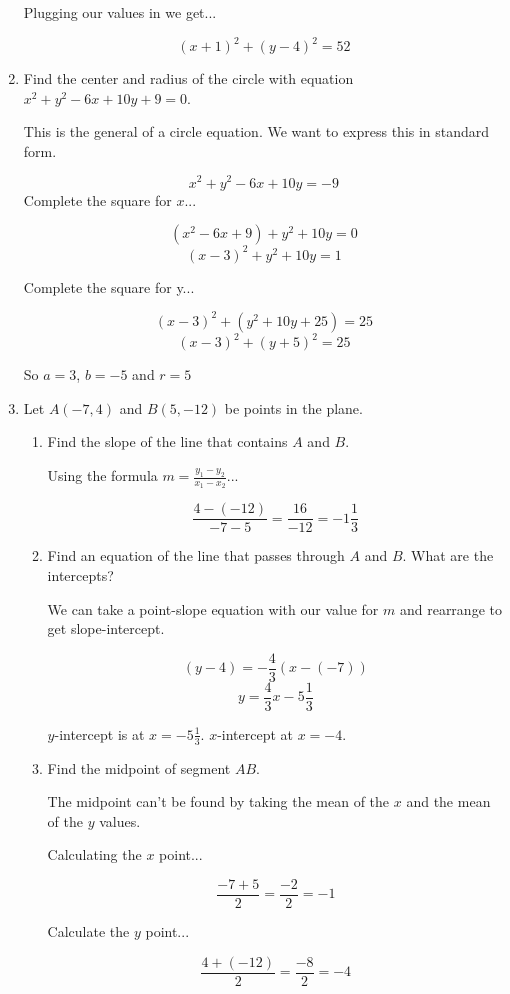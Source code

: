 \documentclass{article}
\begin{document}
\begin{enumerate}
	Plugging our values in we get...

	$$(x + 1)^2 + (y  - 4)^2 = 52$$

	\item Find the center and radius of the circle with equation $x^2 + y^2 - 6x + 10y + 9 = 0$.

		This is the general of a circle equation. We want to express this in standard form.

		$$x^2 + y^2 - 6x + 10y = -9$$
		Complete the square for $x$...

		$$(x^2 - 6x + 9) + y^2 + 10y = 0$$
		$$(x - 3)^2 + y^2 + 10y = 1$$

		Complete the square for y...

		$$(x-3)^2 + (y^2 + 10y + 25) = 25$$
		$$(x-3)^2 + (y + 5)^2 = 25$$

		So $a = 3$, $b = -5$ and $r= 5$ 

	\item Let $A(-7, 4)$ and $B(5, -12)$ be points in the plane.

	\begin{enumerate}

		\item Find the slope of the line that contains $A$ and $B$.

		Using the formula $m=\frac{y_1 - y_2}{x_1 - x_2}$...

		$$\frac{4 -(-12)}{-7 - 5} = \frac{16}{-12} = -1\frac{1}{3}$$

		\item Find an equation of the line that passes through $A$ and $B$. What are the intercepts?

			We can take a point-slope equation with our value for $m$ and rearrange to get slope-intercept.

			$$(y - 4) = -\frac{4}{3}(x - (-7))$$
			$$y = \frac{4}{3}x - 5\frac{1}{3}$$

			$y$-intercept is at $x=-5\frac{1}{3}$. $x$-intercept at $x = -4$.

	\item Find the midpoint of segment $AB$.

			The midpoint can't be found by taking the mean of the $x$ and the mean of the $y$ values.

			Calculating the $x$ point...

			$$\frac{-7 + 5}{2} = \frac{-2}{2} = -1$$

			Calculate the $y$ point...

			$$\frac{4 + (-12)}{2} = \frac{-8}{2} = -4$$


\end{enumerate}
\end{enumerate}
\end{document}
